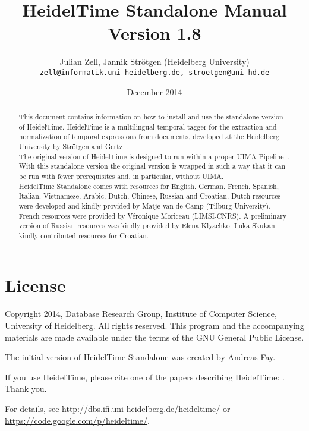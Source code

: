 \documentclass[
     11pt,         %
     a4paper,      %
     oneside,
     ]{article}
\newcommand{\product}{HeidelTime Standalone}
\newcommand{\languages}{English, German, French, Spanish, Italian, Vietnamese, Arabic, Dutch, Chinese, Russian and Croatian}
\begin{document}
\title{%
HeidelTime Standalone Manual\\Version 1.8
}
\author{Julian Zell, Jannik Str\"otgen (Heidelberg University)\\[0.2em]
\small \texttt{zell@informatik.uni-heidelberg.de, stroetgen@uni-hd.de}
}
\date{December 2014}
\maketitle

\begin{abstract}
This document contains information on how to install and use the standalone version of HeidelTime. HeidelTime is a multilingual temporal tagger for the extraction and normalization of temporal expressions from documents, developed at the Heidelberg University by Str\"otgen and Gertz~\cite{Strotgen2010, HeidelTime, StroetgenGertz2013}.\\
The original version of HeidelTime is designed to run within a proper UIMA-Pipeline~\cite{UIMA}. With this standalone version the original version is wrapped in such a way that it can be run with fewer prerequisites and, in particular, without UIMA.\\
HeidelTime Standalone comes with resources for \languages. Dutch resources were developed and kindly provided by Matje van de Camp (Tilburg University)\cite{Matje}. French resources were provided by Véronique Moriceau (LIMSI-CNRS)\cite{Veronique}. A preliminary version of Russian resources was kindly provided by Elena Klyachko\cite{Elena}. Luka Skukan\cite{Luka} kindly contributed resources for Croatian.
\end{abstract}

\newpage
\tableofcontents
\newpage






\newpage
\section{License}
Copyright \textcopyright{} 2014, Database Research Group, Institute of Computer Science, University of Heidelberg. 
All rights reserved. This program and the accompanying materials are made available under the terms of the GNU General Public License.

The initial version of \product{} was created by Andreas Fay.

If you use HeidelTime, please cite one of the papers describing HeidelTime: \cite{Strotgen2010, StroetgenGertz2013}. Thank you.

For details, see \url{http://dbs.ifi.uni-heidelberg.de/heideltime/} or \\
\url{https://code.google.com/p/heideltime/}.



\newpage



\newpage

\end{document}
